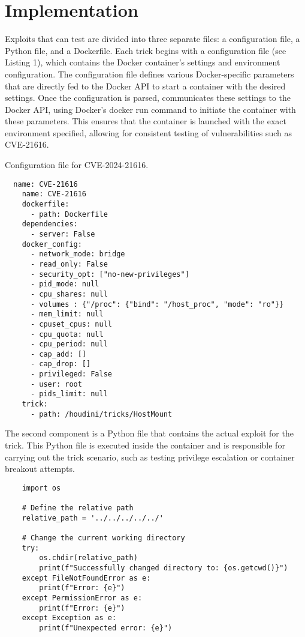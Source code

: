 \section{Implementation}
\label{sec:implementation}

Exploits that \houdini can test are divided into three separate files: a configuration file, a Python file, and a Dockerfile. Each \houdini trick begins with a configuration file (see Listing 1), which contains the Docker container's settings and environment configuration. The configuration file defines various Docker-specific parameters that are directly fed to the Docker API to start a container with the desired settings. Once the configuration is parsed, \houdini communicates these settings to the Docker API, using Docker's docker run command to initiate the container with these parameters. This ensures that the container is launched with the exact environment specified, allowing for consistent testing of vulnerabilities such as CVE-21616.


\begin{listing}[h]
  \caption{Configuration file for CVE-2024-21616.}
  \label{lst:configuration-file}
  \begin{verbatim}
  name: CVE-21616
    name: CVE-21616
    dockerfile:
      - path: Dockerfile
    dependencies:
      - server: False
    docker_config: 
      - network_mode: bridge
      - read_only: False
      - security_opt: ["no-new-privileges"]
      - pid_mode: null
      - cpu_shares: null
      - volumes : {"/proc": {"bind": "/host_proc", "mode": "ro"}}
      - mem_limit: null
      - cpuset_cpus: null
      - cpu_quota: null
      - cpu_period: null
      - cap_add: []
      - cap_drop: []
      - privileged: False
      - user: root
      - pids_limit: null
    trick:
      - path: /houdini/tricks/HostMount
  \end{verbatim}
\end{listing}



The second component is a Python file that contains the actual exploit for the trick. This Python file is executed inside the container and is responsible for carrying out the trick scenario, such as testing privilege escalation or container breakout attempts.


\begin{listing}[h]
  \caption{}
\label{lst:pythonfile}
  \begin{verbatim}
    import os

    # Define the relative path
    relative_path = '../../../../../'

    # Change the current working directory
    try:
        os.chdir(relative_path)
        print(f"Successfully changed directory to: {os.getcwd()}")
    except FileNotFoundError as e:
        print(f"Error: {e}")
    except PermissionError as e:
        print(f"Error: {e}")
    except Exception as e:
        print(f"Unexpected error: {e}")
  \end{verbatim}
\end{listing}


